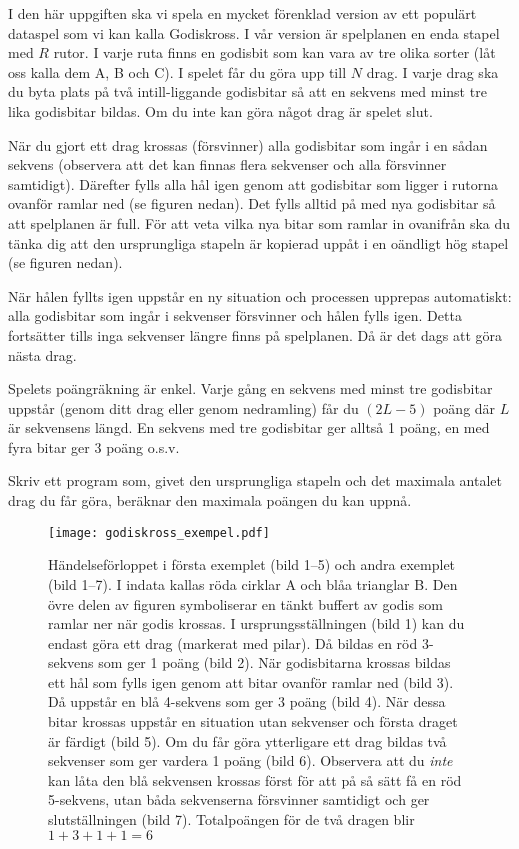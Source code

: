 
I den här uppgiften ska vi spela en mycket förenklad version av ett populärt dataspel som vi kan kalla Godiskross. I vår version är spelplanen en enda stapel med $R$ rutor. I varje ruta finns en godisbit som kan vara av tre olika sorter (låt oss kalla dem A, B och C). I spelet får du göra upp till $N$ drag. I varje drag ska du byta plats på två intill-liggande godisbitar så att en sekvens med minst tre lika godisbitar bildas. Om du inte kan göra något drag är spelet slut.

När du gjort ett drag krossas (försvinner) alla godisbitar som ingår i en sådan sekvens (observera att det kan finnas flera sekvenser och alla försvinner samtidigt). Därefter fylls alla hål igen genom att godisbitar som ligger i rutorna ovanför ramlar ned (se figuren nedan). Det fylls alltid på med nya godisbitar så att spelplanen är full. För att veta vilka nya bitar som ramlar in ovanifrån ska du tänka dig att den ursprungliga stapeln är kopierad uppåt i en oändligt hög stapel (se figuren nedan).

När hålen fyllts igen uppstår en ny situation och processen upprepas automatiskt: alla godisbitar som ingår i sekvenser försvinner och hålen fylls igen. Detta fortsätter tills inga sekvenser längre finns på spelplanen. Då är det dags att göra nästa drag.

Spelets poängräkning är enkel. Varje gång en sekvens med minst tre godisbitar uppstår (genom ditt drag eller genom nedramling) får du $(2L-5)$ poäng där $L$ är sekvensens längd. En sekvens med tre godisbitar ger alltså 1 poäng, en med fyra bitar ger 3 poäng o.s.v.

Skriv ett program som, givet den ursprungliga stapeln och det maximala antalet drag du får göra, beräknar den maximala poängen du kan uppnå.

\begin{figure}[ht!]
\centering
\texttt{[image: godiskross\_exempel.pdf]}
\caption{Händelseförloppet i första exemplet (bild 1--5) och andra exemplet (bild 1--7). I indata kallas röda cirklar A och blåa trianglar B. Den övre delen av figuren symboliserar en tänkt buffert av godis som ramlar ner när godis krossas. I ursprungsställningen (bild 1) kan du endast göra ett drag (markerat med pilar). Då bildas en röd 3-sekvens som ger 1 poäng (bild 2). När godisbitarna krossas bildas ett hål som fylls igen genom att bitar ovanför ramlar ned (bild 3). 
Då uppstår en blå 4-sekvens som ger 3 poäng (bild 4). När dessa bitar krossas uppstår en situation utan sekvenser och första draget är färdigt (bild 5). Om du får göra ytterligare ett drag bildas två sekvenser som ger vardera 1 poäng (bild 6). Observera att du {\em inte} kan låta den blå sekvensen krossas först för att på så sätt få en röd 5-sekvens, utan båda sekvenserna försvinner samtidigt och ger slutställningen (bild 7). Totalpoängen för de två dragen blir $1+3+1+1=6$}
\label{overflow}
\end{figure}

